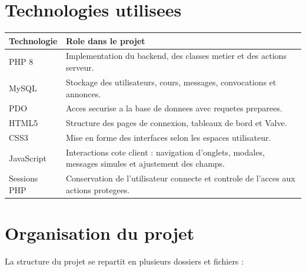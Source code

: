 \documentclass[12pt,a4paper]{article}
\begin{document}
\section{Technologies utilisees}

\begin{longtable}{|p{4cm}|p{10cm}|}
\hline
\textbf{Technologie} & \textbf{Role dans le projet} \\
\hline
PHP 8 & Implementation du backend, des classes metier et des actions serveur. \\
\hline
MySQL & Stockage des utilisateurs, cours, messages, convocations et annonces. \\
\hline
PDO & Acces securise a la base de donnees avec requetes preparees. \\
\hline
HTML5 & Structure des pages de connexion, tableaux de bord et Valve. \\
\hline
CSS3 & Mise en forme des interfaces selon les espaces utilisateur. \\
\hline
JavaScript & Interactions cote client : navigation d'onglets, modales, messages simules et ajustement des champs. \\
\hline
Sessions PHP & Conservation de l'utilisateur connecte et controle de l'acces aux actions protegees. \\
\hline
\end{longtable}

\section{Organisation du projet}

La structure du projet se repartit en plusieurs dossiers et fichiers :
\end{document}
